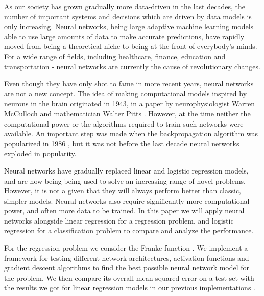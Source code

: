 


As our society has grown gradually more data-driven in the last decades, the number of important systems and decisions which are driven by data models is only increasing.
Neural networks, being large adaptive machine learning models able to use large amounts of data to make accurate predictions, have rapidly moved from being a theoretical niche to being at the front of everybody's minds.
For a wide range of fields, including healthcare, finance, education and transportation - neural networks are currently the cause of revolutionary changes.

Even though they have only shot to fame in more recent years, neural networks are not a new concept.
The idea of making computational models inspired by neurons in the brain originated in 1943, in a paper by neurophysiologist Warren McCulloch and mathematician Walter Pitts \citep[p. 4]{NN_history}.
However, at the time neither the computational power or the algorithms required to train such networks were available.
An important step was made when the backpropagation algorithm was popularized in 1986 \citep[p. 5]{NN_history}, but it was not before the last decade neural networks exploded in popularity.

Neural networks have gradually replaced linear and logistic regression models, and are now being being used to solve an increasing range of novel problems.
However, it is not a given that they will always perform better than classic, simpler models.
Neural networks also require significantly more computational power, and often more data to be trained.
In this paper we will apply neural networks alongside linear regression for a regression problem, and logistic regression for a classification problem to compare and analyze the performance. 

For the regression problem we consider the Franke function \cite{frank}.
We implement a framework for testing different network architectures, activation functions and gradient descent algorithms to find the best possible neural network model for the problem.
We then compare its overall mean squared error on a test set with the results we got for linear regression models in our previous implementations \cite{project1}.

